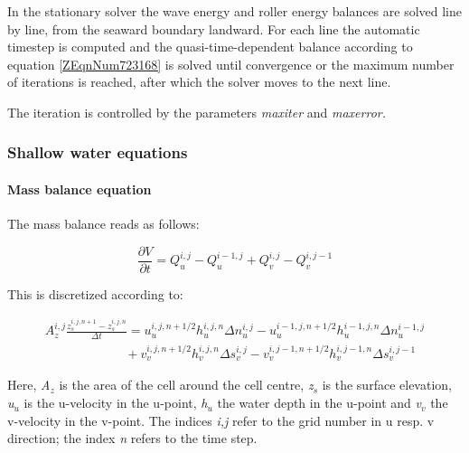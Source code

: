 \documentclass{article}
\begin{document}
\noindent In the stationary solver the wave energy and roller energy balances are solved line by line, from the seaward boundary landward. For each line the automatic timestep is computed and the quasi-time-dependent balance according to equation \eqref{ZEqnNum723168} is solved until convergence or the maximum number of iterations is reached, after which the solver moves to the next line. 

\noindent The iteration is controlled by the parameters \textit{maxiter } and \textit{maxerror.}

\noindent 


\subsubsection{ Shallow water equations}


\paragraph{ Mass balance equation}

\noindent The mass balance reads as follows: 

\noindent 
\begin{equation} \label{6.4)} 
\frac{\partial V}{\partial t} =Q_{u}^{i,j} -Q_{u}^{i-1,j} +Q_{v}^{i,j} -Q_{v}^{i,j-1}  
\end{equation} 


\noindent This is discretized according to:

   
\begin{equation} \label{6.5)} 
\begin{array}{l} {A_{z}^{i,j} \frac{z_{s}^{i,j,n+1} -z_{s}^{i,j,n} }{\Delta t} =u_{u}^{i,j,n+1/2} h_{u}^{i,j,n} \Delta n_{u}^{i,j} -u_{u}^{i-1,j,n+1/2} h_{u}^{i-1,j,n} \Delta n_{u}^{i-1,j} } \\ {\, \, \, \, \, \, \, \, \, \, \, \, \, \, \, \, \, \, \, \, \, \, \, \, \, \, \, \, \, \, \, \, \, \, \, \, \, \, +v_{v}^{i,j,n+1/2} h_{v}^{i,j,n} \Delta s_{v}^{i,j} -v_{v}^{i,j-1,n+1/2} h_{v}^{i,j-1,n} \Delta s_{v}^{i,j-1} } \end{array} 
\end{equation} 


\noindent Here, \textit{A${}_{z}$ }is the area of the cell around  the cell centre, \textit{z${}_{s}$ }is the surface elevation, \textit{u${}_{u}$} is the u-velocity in the u-point, \textit{h${}_{u}$} the water depth in the u-point and \textit{v${}_{v}$} the v-velocity in the v-point. The indices \textit{i,j} refer to the grid number in u resp. v direction; the index \textit{n} refers to the time step.
\end{document}
